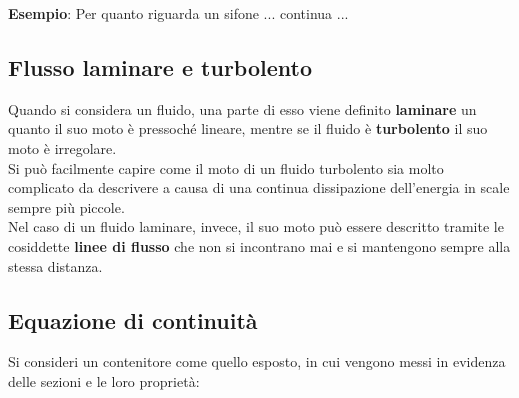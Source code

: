 \documentclass[a4paper]{extarticle}
\begin{document}
\vspace{1em}
\noindent
\textbf{Esempio}: Per quanto riguarda un sifone ... continua ...

\vspace{1em}
\noindent
\subsection{Flusso laminare e turbolento}
Quando si considera un fluido, una parte di esso viene definito \textbf{laminare} un quanto il suo moto è pressoché lineare, mentre se il fluido è \textbf{turbolento} il suo moto è irregolare.\\
Si può facilmente capire come il moto di un fluido turbolento sia molto complicato da descrivere a causa di una continua dissipazione dell'energia in scale sempre più piccole.\\
Nel caso di un fluido laminare, invece, il suo moto può essere descritto tramite le cosiddette \textbf{linee di flusso} che non si incontrano mai e si mantengono sempre alla stessa distanza.

\vspace{1em}
\noindent
\subsection{Equazione di continuità}
Si consideri un contenitore come quello esposto, in cui vengono messi in evidenza delle sezioni e le loro proprietà:
\end{document}
